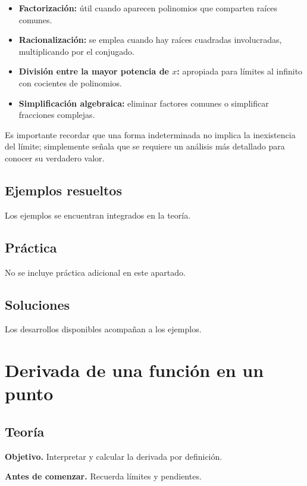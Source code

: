 \documentclass[12pt]{article}
\begin{document}
\begin{itemize}
    \item \textbf{Factorización:} útil cuando aparecen polinomios que comparten raíces comunes.
    \item \textbf{Racionalización:} se emplea cuando hay raíces cuadradas involucradas, multiplicando por el conjugado.
    \item \textbf{División entre la mayor potencia de $x$:} apropiada para límites al infinito con cocientes de polinomios.
    \item \textbf{Simplificación algebraica:} eliminar factores comunes o simplificar fracciones complejas.
\end{itemize}

Es importante recordar que una forma indeterminada no implica la inexistencia del límite; simplemente señala que se requiere un análisis más detallado para conocer su verdadero valor.



\subsection{Ejemplos resueltos}

Los ejemplos se encuentran integrados en la teoría.

\subsection{Práctica}

No se incluye práctica adicional en este apartado.

\subsection{Soluciones}

Los desarrollos disponibles acompañan a los ejemplos.

\section{Derivada de una función en un punto}

\subsection{Teoría}

\textbf{Objetivo.} Interpretar y calcular la derivada por definición.

\textbf{Antes de comenzar.} Recuerda límites y pendientes.
\end{document}

